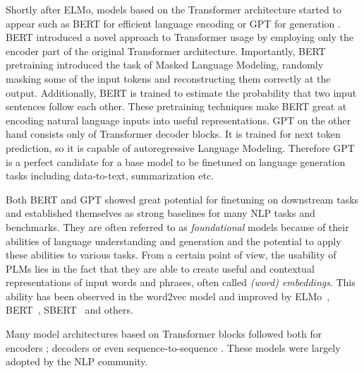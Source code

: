 Shortly after ELMo, models based on the Transformer architecture started to appear such as BERT for efficient language encoding \cite{devlin2019} or GPT for generation \cite{radford2018improving}.
BERT introduced a novel approach to Transformer usage by employing only the encoder part of the original Transformer architecture.
Importantly, BERT pretraining introduced the task of Masked Language Modeling, randomly masking some of the input tokens and reconstructing them correctly at the output.
Additionally, BERT is trained to estimate the probability that two input sentences follow each other.
These pretraining techniques make BERT great at encoding natural language inputs into useful representations.
GPT on the other hand consists only of Transformer decoder blocks.
It is trained for next token prediction, so it is capable of autoregressive Language Modeling.
Therefore GPT is a perfect candidate for a base model to be finetuned on language generation tasks including data-to-text, summarization etc.


Both BERT and GPT showed great potential for finetuning on downstream tasks and established themselves as strong baselines for many NLP tasks and benchmarks.
They are often referred to as \emph{foundational} models because of their abilities of language understanding and generation and the potential to apply these abilities to various tasks.
From a certain point of view, the usability of PLMs lies in the fact that they are able to create useful and contextual representations of input words and phrases, often called \emph{(word) embeddings}.
This ability has been observed in the word2vec model \cite{mikolov2013distributed} and improved by ELMo~\cite{peters-etal-2018-deep}, BERT~\cite{devlin2019}, SBERT~\cite{reimers2019sentence} and others.

Many model architectures based on Transformer blocks followed both for encoders \cite{liu2019roberta,reimers2019sentence}; decoders \cite{radford2019language,brown2020language} or even sequence-to-sequence \cite{raffel2020exploring,lewis-etal-2020-bart}.
These models were largely adopted by the NLP community.


